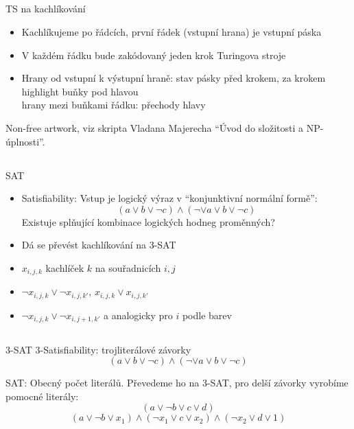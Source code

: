 \documentclass{beamer}
\begin{document}
\subsection{}
\begin{frame}{TS na kachlíkování}
\begin{itemize}
\item Kachlíkujeme po řádcích, první řádek (vstupní hrana) je vstupní páska
\item V každém řádku bude zakódovaný jeden krok Turingova stroje
\item Hrany od vstupní k výstupní hraně: stav pásky před krokem, za krokem \\ highlight buňky pod hlavou \\ hrany mezi buňkami řádku: přechody hlavy
\end{itemize}
Non-free artwork, viz skripta Vladana Majerecha ``Úvod do složitosti a NP-úplnosti''.
\end{frame}

\subsection{}
\begin{frame}{SAT}
\begin{itemize}
\item Satisfiability: Vstup je logický výraz v ``konjunktivní normální formě'':
$$ (a \lor b \lor \neg c) \land (\neg \lor a \lor b \lor \neg c) $$
Existuje splňující kombinace logických hodneg proměnných?
\item Dá se převést kachlíkování na 3-SAT
\item $x_{i,j,k}$ kachlíček $k$ na souřadnicích $i,j$
\item $\neg x_{i,j,k} \lor \neg x_{i,j,k'}$, $x_{i,j,k} \lor x_{i,j,k'}$
\item $\neg x_{i,j,k} \lor \neg x_{i,j+1,k'}$ a analogicky pro $i$ podle barev
\end{itemize}
\end{frame}

\subsection{}
\begin{frame}{3-SAT}
3-Satisfiability: trojliterálové závorky
$$ (a \lor b \lor \neg c) \land (\neg \lor a \lor b \lor \neg c) $$

SAT: Obecný počet literálů. Převedeme ho na 3-SAT, pro delší závorky vyrobíme pomocné literály:
$$ (a \lor \neg b \lor c \lor d) $$
$$ (a \lor \neg b \lor x_1) \land (\neg x_1 \lor c \lor x_2) \land (\neg x_2 \lor d \lor 1) $$
\end{frame}
\end{document}

